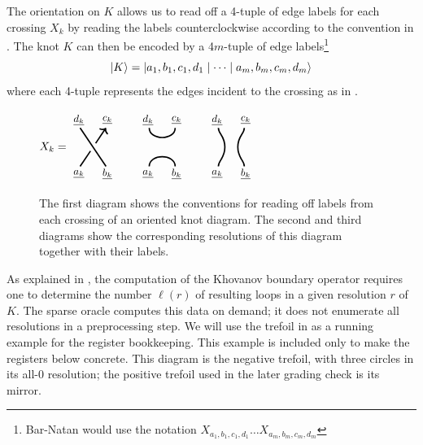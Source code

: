 \documentclass[a4paper,onecolumn,unpublished]{quantumarticle}
\theoremstyle{plain}
\theoremstyle{definition}
\theoremstyle{definition}
\numberwithin{equation}{section}
\newcommand{\hackcenter}[1]{
 \xy (0,0)*{#1}; \endxy}
\begin{document}
The orientation on $K$ allows us to read off a 4-tuple of edge labels for each crossing $X_k$ by reading the labels counterclockwise according to the convention in .
The knot $K$ can then be encoded by a 4$m$-tuple of edge labels\footnote{Bar-Natan would use the notation $X_{a_1,b_1,c_1,d_1} \dots X_{a_m,b_m,c_m,d_m}$} 
\begin{equation}
\ket{K} = \ket{a_1, b_1, c_1 ,d_1 \mid \dots \mid  a_m, b_m, c_m ,d_m}
\end{equation}
where each 4-tuple represents the edges incident to the crossing as in .
\begin{figure}[htbp]  \centering
$ 
X_k =  \hackcenter{
\begin{tikzpicture}[scale=0.8]
\draw[very thick, ] (.5,0) -- (-.5,1.5);
\draw[very thick ] (-.5,0) -- (-.1,.6);
\draw[very thick, -> ] (.1,.9) -- (.5,1.5);
\node at (-.55,-.3) {\small$\underline{a_k}$};
\node at (.55,-.3) {\small$\underline{b_k}$};
\node at (-.55,1.8) {\small$\underline{d_k}$};
\node at (.55,1.8) {\small$\underline{c_k}$};
\end{tikzpicture}}    \qquad 
\hackcenter{
\begin{tikzpicture}[scale=0.8]
\draw[very thick, ] (-.5,0) .. controls ++(0,.5) and ++(0,.5) ..  (.5,0);
\draw[very thick, ] (-.5,1.5) .. controls ++(0,-.5) and ++(0,-.5) ..  (.5,1.5);
\node at (-.55,-.3) {\small$\underline{a_k}$};
\node at (.55,-.3) {\small$\underline{b_k}$};
\node at (-.55,1.8) {\small$\underline{d_k}$};
\node at (.55,1.8) {\small$\underline{c_k}$};
\end{tikzpicture}} 
\qquad 
\hackcenter{
\begin{tikzpicture}[scale=0.8]
\draw[very thick, ] (-.5,0) .. controls ++(0,.25 ) and ++(.0,-.45) ..  (-0.25,.75) ..                   controls ++(0,.45) and ++(0,-.25 ) ..(-.5,1.5);
\draw[very thick, ] (.5,0) .. controls ++(0,.25 ) and ++(.0,-.45) ..  (0.25,.75) ..                   controls ++(0,.45) and ++(0,-.25 ) ..(.5,1.5);
\node at (-.55,-.3) {\small$\underline{a_k}$};
\node at (.55,-.3) {\small$\underline{b_k}$};
\node at (-.55,1.8) {\small$\underline{d_k}$};
\node at (.55,1.8) {\small$\underline{c_k}$};
\end{tikzpicture}} 
$
\caption{\justifying The first diagram shows the conventions for reading off labels from each crossing of an oriented knot diagram. The second and third diagrams show the corresponding resolutions of this diagram together with their labels.}
\label{fig:crossing-labels}
\end{figure}
As explained in , the computation of the Khovanov boundary operator requires one to determine the number $\ell(r)$ of resulting loops in a given resolution $r$ of $K$. The sparse oracle computes this data on demand; it does not enumerate all resolutions in a preprocessing step. We will use the trefoil in  as a running example for the register bookkeeping. This example is included only to make the registers below concrete. This diagram is the negative trefoil, with three circles in its all-\(0\) resolution; the positive trefoil used in the later grading check is its mirror.
\end{document}
